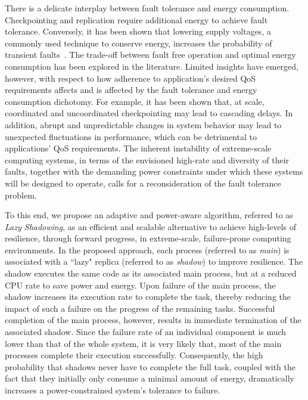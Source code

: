 There is a delicate interplay between fault tolerance and energy consumption. Checkpointing and replication require additional energy to achieve fault tolerance. Conversely, it has been shown that lowering supply voltages, a commonly used technique to conserve energy, increases the probability of transient faults~\cite{chandra2008defect}. The trade-off between fault free operation and optimal energy consumption has been explored in the literature. Limited insights have emerged, however, with respect to how adherence to application's desired QoS requirements affects and is affected by the fault tolerance and energy consumption dichotomy. For example, it has been shown that, at scale, coordinated and uncoordinated checkpointing may lead to cascading delays. %
In addition, abrupt and unpredictable changes in system behavior may lead to unexpected fluctuations in performance, which can be detrimental to applications' QoS requirements. The inherent instability of extreme-scale computing systems, in terms of the envisioned high-rate and diversity of their faults, together with the demanding power constraints under which these systems will be designed to operate, calls for a reconsideration of the fault tolerance problem.

To this end, we propose an adaptive and power-aware algorithm, referred to as \textit{Lazy
Shadowing}, as an efficient and scalable alternative to achieve high-levels of resilience, through
forward progress, in extreme-scale, failure-prone computing environments. In the proposed
approach, each process (referred to as \textit{main}) is associated with a ``lazy" replica (referred to as \textit{shadow}) to improve resilience. The shadow executes the same code as its
associated main process, but at a reduced CPU rate to save power and energy. %
Upon failure of the main process, the shadow increases its 
execution rate to complete the task, thereby reducing the impact of such a failure on the progress of
the remaining tasks. Successful completion of the main process, however, results in immediate
termination of the associated shadow. Since the failure rate of an individual component is much lower than that of 
the whole system, it is very likely that, most of the main processes complete their execution
successfully. %
Consequently, the high probability that shadows never have to complete the full task, coupled with the fact that 
they initially only consume a minimal amount of energy, 
dramatically increases a power-constrained system's tolerance to failure.

